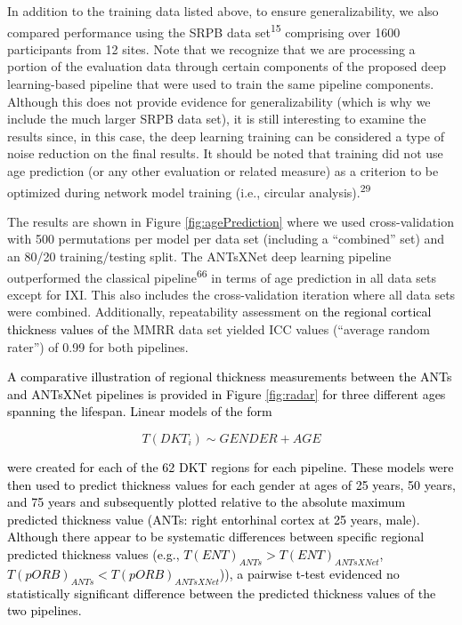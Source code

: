 \documentclass[
  12pt,
]{article}
\begin{document}
In addition to the training data listed above, to ensure
generalizability, we also compared performance using the SRPB data
set\textsuperscript{15} comprising over 1600 participants from 12 sites.
Note that we recognize that we are processing a portion of the
evaluation data through certain components of the proposed deep
learning-based pipeline that were used to train the same pipeline
components. Although this does not provide evidence for generalizability
(which is why we include the much larger SRPB data set), it is still
interesting to examine the results since, in this case, the deep
learning training can be considered a type of noise reduction on the
final results. It should be noted that training did not use age
prediction (or any other evaluation or related measure) as a criterion
to be optimized during network model training (i.e., circular
analysis).\textsuperscript{29}

The results are shown in Figure \ref{fig:agePrediction} where we used
cross-validation with 500 permutations per model per data set (including
a ``combined'' set) and an 80/20 training/testing split. The ANTsXNet
deep learning pipeline outperformed the classical
pipeline\textsuperscript{66} in terms of age prediction in all data sets
except for IXI. This also includes the cross-validation iteration where
all data sets were combined. Additionally, repeatability assessment on
\textcolor{black}{the regional cortical thickness
values of the} MMRR data set yielded ICC values (``average random
rater'') of 0.99 for both pipelines.

\textcolor{black}{
A comparative illustration of regional thickness measurements between the ANTs
and ANTsXNet pipelines is provided in Figure \ref{fig:radar} for three different
ages spanning the lifespan.  Linear models of the form}

\begin{equation}
  T(DKT_i) \sim GENDER + AGE
\end{equation}

\textcolor{black}{
were created for each of the 62 DKT regions for each pipeline.  These models were
then used to predict thickness values for each gender at ages of 25 years, 50 years,
and 75 years and subsequently plotted relative to the absolute maximum predicted
thickness value (ANTs:  right entorhinal cortex at 25 years, male).  Although
there appear to be systematic differences between specific regional predicted
thickness values (e.g., $T(ENT)_{ANTs} > T(ENT)_{ANTsXNet}$,
$T(pORB)_{ANTs} < T(pORB)_{ANTsXNet}$)), a pairwise t-test evidenced no statistically
significant difference between the predicted thickness values of the two pipelines.}
\end{document}
